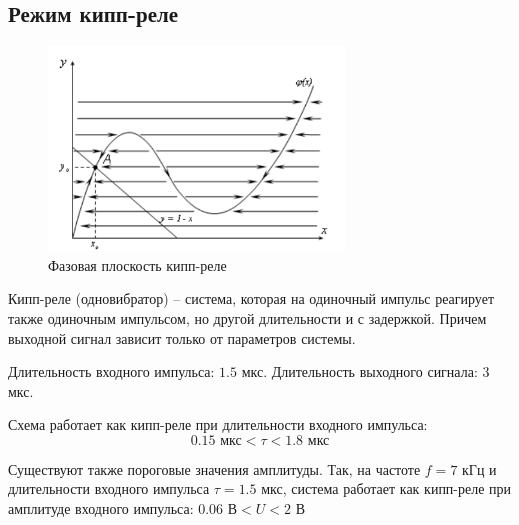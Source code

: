 \documentclass[a4paper,14pt]{extarticle}
\begin{document}
\subsection{Режим кипп-реле}
\begin{figure}[H]
	\centering
	\includegraphics[width=0.7\textwidth]{photo/kipp}
	\caption{Фазовая плоскость кипп-реле}
	\label{fig:figure2}
\end{figure}

Кипп-реле (одновибратор) -- система, которая на одиночный импульс реагирует также одиночным импульсом, но другой длительности и с задержкой. Причем выходной сигнал зависит только от параметров системы.

Длительность входного импульса: $1.5$ мкс. Длительность выходного сигнала: $3$ мкс.

Схема работает как кипп-реле при длительности входного импульса: 
$$0.15 \text{ мкс}<\tau<1.8 \text{ мкс}$$

Существуют также пороговые значения амплитуды. Так, на частоте $f = 7$ кГц и длительности входного импульса $\tau = 1.5$ мкс, система работает как кипп-реле при амплитуде входного импульса: $0.06 \text{ В}<U<2\text{ В}$
\end{document}
